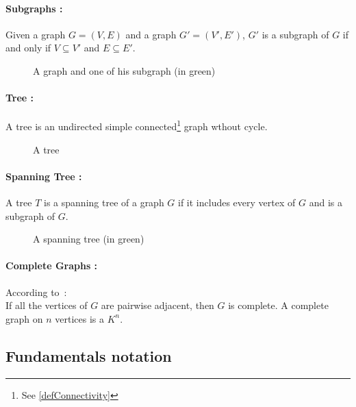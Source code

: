 \paragraph{Subgraphs :}
Given a graph $G = (V,E)$ and a graph $G' = (V',E')$, $G'$ is a subgraph of $G$ 
if and only if $V \subseteq V'$ and $E \subseteq E'$.

\begin{figure}[!h]
  \begin{center}
    
  \end{center}
  \caption{A graph and one of his subgraph (in green)}
\end{figure}

\paragraph{Tree :}
A tree is an undirected simple connected\footnote{See \ref{defConnectivity}}
graph wthout cycle.

\begin{figure}[!h]
  \begin{center}
    
  \end{center}
  \caption{A tree}
\end{figure}

\paragraph{Spanning Tree :}
A tree $T$ is a spanning tree of a graph $G$ if it includes every vertex of $G$ 
and is a subgraph of $G$.

\begin{figure}[!h]
  \begin{center}
    
  \end{center}
  \caption{A spanning tree (in green)}
\end{figure}

\paragraph{Complete Graphs :}
According to~\cite{Diestel}:\\
If all the vertices of $G$ are pairwise adjacent, then $G$ is complete. A
complete graph on $n$ vertices is a $K^n$.

\subsection{Fundamentals notation}
